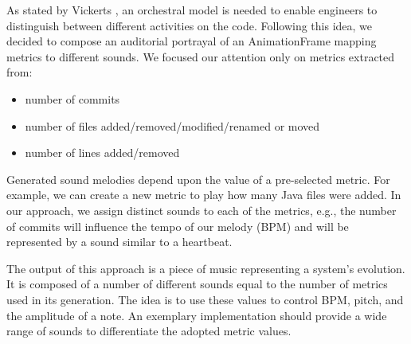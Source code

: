As stated by Vickerts \cite{Vickers2004}, an orchestral model is needed to enable engineers to distinguish between different activities on the code. Following this idea, we decided to compose an auditorial portrayal of an  AnimationFrame mapping metrics to different sounds. We focused our attention only on metrics extracted from:
\begin{itemize}
    \item number of commits
    \item number of files added/removed/modified/renamed or moved
    \item number of lines added/removed
\end{itemize}

Generated sound melodies depend upon the value of a pre-selected metric. For example, we can create a new metric to play how many Java files were added. In our approach, we assign distinct sounds to each of the metrics, e.g., the number of commits will influence the tempo of our melody (BPM) and will be represented by a sound similar to a heartbeat.

The output of this approach is a piece of music representing a system's evolution. It is composed of a number of different sounds equal to the number of metrics used in its generation. The idea is to use these values to control BPM, pitch, and the amplitude of a note. 
An exemplary implementation should provide a wide range of sounds to differentiate the adopted metric values. 










